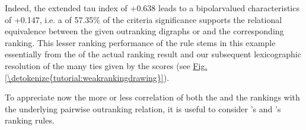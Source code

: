 \documentclass[a4paper,12pt,english]{sphinxhowto}
\begin{document}
Indeed, the extended  tau index of +0.638 leads to a bipolar\sphinxhyphen{}valued  characteristics of +0.147, i.e. a  of 57.35\% of the criteria significance supports the relational equivalence between the given outranking digraphs  or   and the corresponding  ranking. This lesser ranking performance of the  rule stems in this example essentially from the  of the actual ranking result and our subsequent  lexicographic resolution of the many ties given by the  scores (see \hyperref[\detokenize{tutorial:weakrankingdrawing}]{Fig.\@ \ref{\detokenize{tutorial:weakrankingdrawing}}}).

To appreciate now the more or less correlation of both the  and the  rankings with the underlying pairwise outranking relation, it is useful to consider ’s and ’s  ranking rules.
\end{document}
